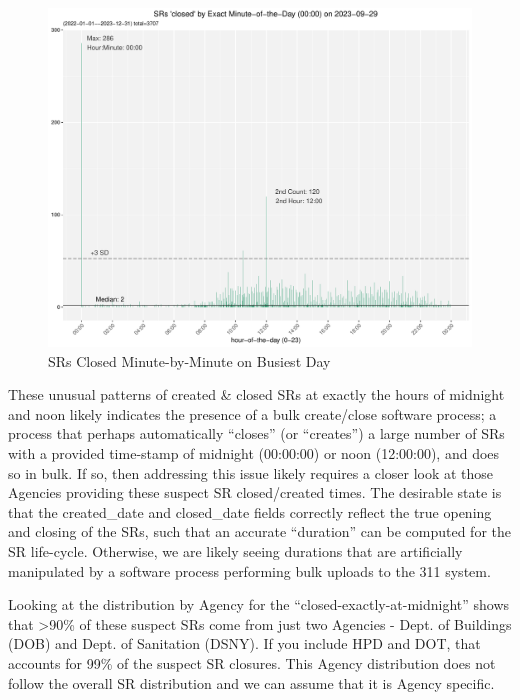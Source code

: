 \documentclass[12pt, titlepage]{article}
\begin{document}
{ 	\begin{figure}[tbp]
		\centering
		\includegraphics[width=\textwidth]{2-year-trend-SR_closed_by_minute_of_busiest_day.pdf}
		\caption{SRs Closed Minute-by-Minute on Busiest Day}
		\label{fig:busiestclosed}
	\end{figure}	

	These unusual patterns of created \& closed SRs at exactly the hours of midnight and noon likely indicates
	the presence of a bulk create/close software process; a process that perhaps automatically ``closes'' (or ``creates'') 
	a large number of SRs with a provided time-stamp of midnight (00:00:00) or noon (12:00:00), and does so in bulk. 
	If so, then addressing this issue likely requires a closer look at those Agencies providing these suspect SR closed/created times.
	 The desirable state is that the created\_date and closed\_date fields correctly reflect the true opening and closing 
	 of the SRs, such that an accurate ``duration'' can be computed for the SR life-cycle. Otherwise, we are likely seeing 
	 durations that are artificially manipulated by a software process performing bulk uploads to the 311 system.

	Looking at the distribution by Agency for the ``closed-exactly-at-midnight'' shows that \textgreater90\% of these suspect SRs come from just two Agencies - Dept. of 
	Buildings (DOB) and Dept. of Sanitation (DSNY). If you include HPD and DOT, that accounts for 99\% of the suspect SR closures. This Agency
	distribution does not follow the overall SR distribution and we can assume that it is Agency specific. 

}
\end{document}
